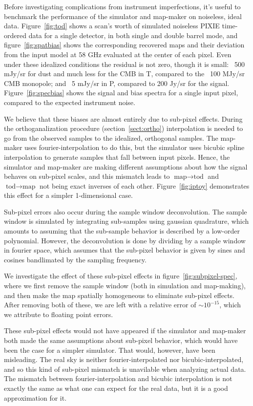 \documentclass{article}
\begin{document}
Before investigating complications from instrument imperfections,
it's useful to benchmark the performance of the simulator
and map-maker on noiseless, ideal data. Figure~\ref{fig:tod} shows
a scan's worth of simulated noiseless PIXIE time-ordered data for
a single detector, in both single and double barrel mode, and
figure~\ref{fig:spatbias} shows the corresponding recovered maps
and their deviation from the input model at 58 GHz evaluated at
the center of each pixel. Even under these idealized conditions
the residual is not zero, though it is small: ~500 mJy/sr for
dust and much less for the CMB in T, compared to the ~100 MJy/sr
CMB monopole; and ~5 mJy/sr in P, compared to 200 Jy/sr for the signal.
Figure~\ref{fig:specbias} shows the signal and bias spectra for
a single input pixel, compared to the expected instrument noise.

We believe that these biases are almost entirely due to sub-pixel effects.
During the orthoganalization procedure (section~\ref{sect:ortho})
interpolation is needed to go from the observed samples to the
idealized, orthogonal samples. The map-maker uses fourier-interpolation
to do this, but the simulator uses bicubic spline interpolation to
generate samples that fall between input pixels. Hence, the
simulator and map-maker are making different assumptions about how
the signal behaves on sub-pixel scales, and this mismatch leads
to $\textrm{map}\rightarrow\textrm{tod}$ and $\textrm{tod}\rightarrow
\textrm{map}$ not being exact inverses of each other. Figure~\ref{fig:iptoy}
demonstrates this effect for a simpler 1-dimensional case.

Sub-pixel errors also occur during the sample window deconvolution.
The sample window is simulated by integrating sub-samples using
gaussian quadrature, which amounts to assuming that the sub-sample
behavior is described by a low-order polynomial. However, the
deconvolution is done by dividing by a sample window in fourier space,
which assumes that the sub-pixel behavior is given by sines and
cosines bandlimated by the sampling frequency.

We investigate the effect of these sub-pixel effects in
figure~\ref{fig:subpixel-spec}, where we first remove the
sample window (both in simulation and map-making), and then
make the map spatially homogeneous to eliminate sub-pixel effects.
After removing both of these, we are left with a relative error of
$\sim10^{-15}$, which we attribute to floating point errors.

These sub-pixel effects would not have appeared if the simulator
and map-maker both made the same assumptions about sub-pixel behavior,
which would have been the case for a simpler simulator.
That would, however, have been misleading. The real sky is neither
fourier-interpolated nor bicubic-interpolated, and so this kind of
sub-pixel mismatch is unavilable when analyzing actual data. The
mismatch between fourier-interpolation and bicubic interpolation
is not exactly the same as what one can expect for the real data,
but it is a good approximation for it.
\end{document}
